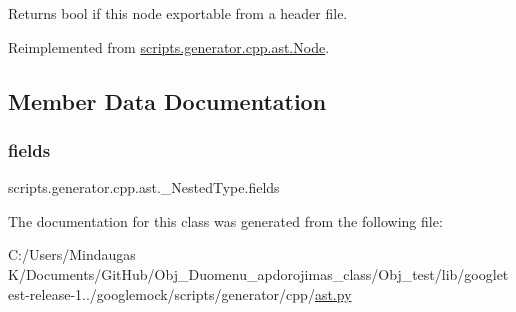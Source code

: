 \begin{DoxyVerb}Returns bool if this node exportable from a header file.\end{DoxyVerb}
 

Reimplemented from \mbox{\hyperlink{classscripts_1_1generator_1_1cpp_1_1ast_1_1_node_a298c446d34e08a78b5ebb477eb55863b}{scripts.\+generator.\+cpp.\+ast.\+Node}}.



\subsection{Member Data Documentation}
\mbox{\label{classscripts_1_1generator_1_1cpp_1_1ast_1_1___nested_type_a62c40430cfb6c24a3c8c34a3a0d2b988}} 
\subsubsection{\texorpdfstring{fields}{fields}}
{\footnotesize\ttfamily scripts.\+generator.\+cpp.\+ast.\+\_\+\+Nested\+Type.\+fields}



The documentation for this class was generated from the following file\+:\begin{DoxyCompactItemize}
\item 
C\+:/\+Users/\+Mindaugas K/\+Documents/\+Git\+Hub/\+Obj\+\_\+\+Duomenu\+\_\+apdorojimas\+\_\+class/\+Obj\+\_\+test/lib/googletest-\/release-\/1../googlemock/scripts/generator/cpp/\mbox{\hyperlink{_obj__test_2lib_2googletest-release-1_88_81_2googlemock_2scripts_2generator_2cpp_2ast_8py}{ast.\+py}}\end{DoxyCompactItemize}
